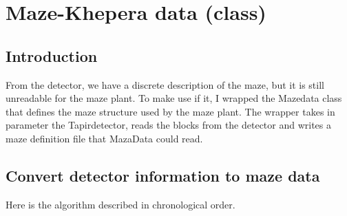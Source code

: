 \section{Maze-Khepera data (class)}
\label{sec:mkd}

\subsection{Introduction}
\label{sec:mkd:intro}

From the detector, we have a discrete description of the maze, but it 
is still unreadable for the maze plant. To make use if it, I wrapped 
the Mazedata class that defines the maze structure used by the maze 
plant. The wrapper takes in parameter the Tapirdetector, reads the blocks 
from the detector and writes a maze definition file that MazaData 
could read.

    

\subsection{Convert detector information to maze data}
\label{sec:mkd:algo}
Here is the algorithm described in chronological order.



